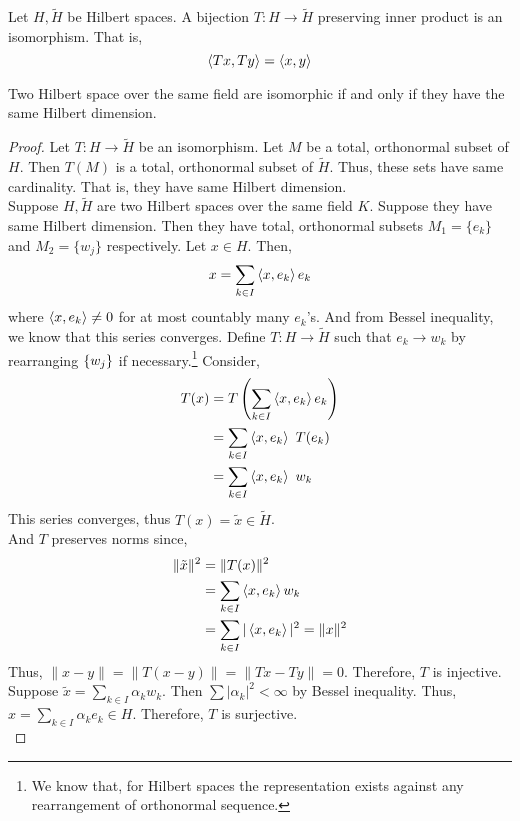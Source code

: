 \begin{definition}[isomorphism]
	Let $H,\tilde{H}$ be Hilbert spaces.
	A bijection $T : H \to \tilde{H}$ preserving inner product is an isomorphism.
	That is, 
	\[ \left\langle Tx,Ty \right\rangle = \left\langle x,y \right\rangle \]
\end{definition}

\begin{theorem}
	Two Hilbert space over the same field are isomorphic if and only if they have the same Hilbert dimension.
\end{theorem}
\begin{proof}
	Let $T : H \to \tilde{H}$ be an isomorphism.
	Let $M$ be a total, orthonormal subset of $H$.
	Then $T(M)$ is a total, orthonormal subset of $\tilde{H}$.
	Thus, these sets have same cardinality.
	That is, they have same Hilbert dimension. \\

	Suppose $H,\tilde{H}$ are two Hilbert spaces over the same field $K$.
	Suppose they have same Hilbert dimension.
	Then they have total, orthonormal subsets $M_1 = \{ e_k \}$ and $M_2 = \{ w_j \}$ respectively.
	Let $x \in H$.
	Then,
	\[ x = \sum_{k \in I} \left\langle x,e_k \right\rangle e_k \]
	where $\left\langle x,e_k \right\rangle \ne 0$ for at most countably many $e_k$'s.
	And from Bessel inequality, we know that this series converges.
	Define $T : H \to \tilde{H}$ such that $e_k \to w_k$ by rearranging $\left\{w_j\right\}$ if necessary.\dag\footnote{
		We know that, for Hilbert spaces the representation exists against any rearrangement of orthonormal sequence.}
	Consider,
	\begin{align*}
		T(x) 
		& = T\left( \sum_{k \in I} \left\langle x,e_k \right\rangle e_k \right) \\
		& = \sum_{k \in I} \left\langle x,e_k \right\rangle \ T(e_k) \\
		& = \sum_{k \in I} \left\langle x,e_k \right\rangle \ w_k 
	\end{align*}
	This series converges, thus $T(x) = \tilde{x} \in \tilde{H}$.\\

	And $T$ preserves norms since,
	\begin{align*}
		\|\tilde{x}\|^2
		& = \|T(x)\|^2 \\
		& = \sum_{k \in I} \left\langle x,e_k \right\rangle w_k \\
		& = \sum_{k \in I} |\left\langle x,e_k \right\rangle|^2 = \|x\|^2
	\end{align*}
	Thus, $\|x-y\| = \|T(x-y)\| = \|Tx-Ty\| = 0$.
	Therefore, $T$ is injective.\\

	Suppose $\displaystyle \tilde{x} = \sum_{k \in I} \alpha_k w_k$.
	Then $\sum |\alpha_k|^2 < \infty$ by Bessel inequality.
	Thus, $\displaystyle x = \sum_{k \in I} \alpha_k e_k \in H$.
	Therefore, $T$ is surjective.\\


\end{proof}
